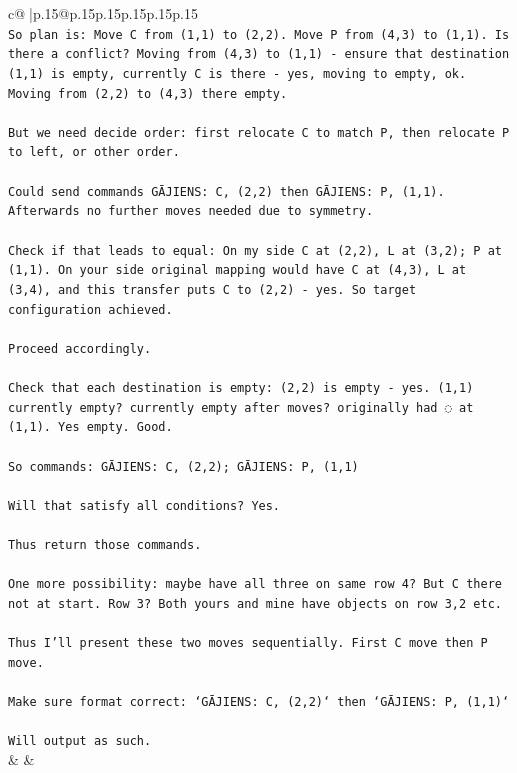 \documentclass{article}
\begin{document}
{\begin{supertabular}{c@{$\;$}|p{.15\linewidth}@{}p{.15\linewidth}p{.15\linewidth}p{.15\linewidth}p{.15\linewidth}p{.15\linewidth}}
{{{\\ 
\texttt{So plan is: Move C from (1,1) to (2,2). Move P from (4,3) to (1,1). Is there a conflict? Moving from (4,3) to (1,1) {-} ensure that destination (1,1) is empty, currently C is there {-} yes, moving to empty, ok. Moving from (2,2) to (4,3) there empty.} \\
\\ 
\texttt{But we need decide order: first relocate C to match P, then relocate P to left, or other order.} \\
\\ 
\texttt{Could send commands GĀJIENS: C, (2,2) then GĀJIENS: P, (1,1). Afterwards no further moves needed due to symmetry.} \\
\\ 
\texttt{Check if that leads to equal: On my side C at (2,2), L at (3,2); P at (1,1). On your side original mapping would have C at (4,3), L at (3,4), and this transfer puts C to (2,2) {-} yes. So target configuration achieved.} \\
\\ 
\texttt{Proceed accordingly.} \\
\\ 
\texttt{Check that each destination is empty: (2,2) is empty {-} yes. (1,1) currently empty? currently empty after moves? originally had ◌ at (1,1). Yes empty. Good.} \\
\\ 
\texttt{So commands: GĀJIENS: C, (2,2); GĀJIENS: P, (1,1)} \\
\\ 
\texttt{Will that satisfy all conditions? Yes.} \\
\\ 
\texttt{Thus return those commands.} \\
\\ 
\texttt{One more possibility: maybe have all three on same row 4? But C there not at start. Row 3? Both yours and mine have objects on row 3,2 etc.} \\
\\ 
\texttt{Thus I'll present these two moves sequentially. First C move then P move.} \\
\\ 
\texttt{Make sure format correct: `GĀJIENS: C, (2,2)` then `GĀJIENS: P, (1,1)`} \\
\\ 
\texttt{Will output as such.} \\
            }
        }
    }
    & & \\ \\


\end{supertabular}}
\end{document}
